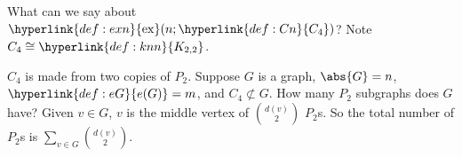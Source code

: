 \documentclass{article}
\DeclareMathOperator{\ext}{ex}
\begin{document}
\begin{eg}
    What can we say about $\hyperlink{def:exn}{\ext}(n; \hyperlink{def:Cn}{C_4})$? Note $C_4 \cong \hyperlink{def:knn}{K_{2, 2}}$.
    \begin{center}
    \end{center}
    $C_4$ is made from two copies of \hyperlink{def:Pn}{$P_2$}. Suppose $G$ is a graph, $\abs{G} = n$, $ \hyperlink{def:eG}{e(G)} = m$, and $C_4 \not\subset G$. How many $P_2$ subgraphs does $G$ have?
    Given $v \in G$, $v$ is the middle vertex of $\binom{d(v)}{2}$ $P_2$s.
    So the total number of $P_2$s is $\sum_{v \in G} \binom{d(v)}{2}$.


\end{eg}
\end{document}
